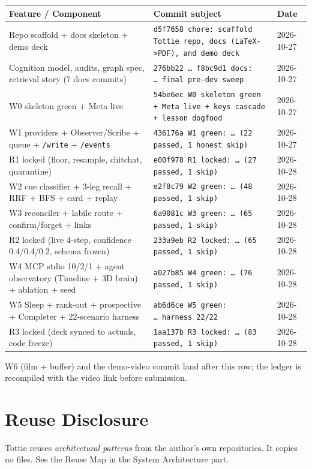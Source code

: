 \begin{longtable}{@{}p{}p{}p{}@{}}
\toprule
Feature / Component & Commit subject & Date \\
\midrule
Repo scaffold + docs skeleton + demo deck &
\texttt{d5f7658 chore: scaffold Tottie repo, docs (LaTeX-\textgreater PDF), and demo deck} & 2026-10-27 \\
Cognition model, audits, graph spec, retrieval story (7 docs commits) &
\texttt{276bb22 \ldots\ f8bc9d1 docs: \ldots\ final pre-dev sweep} & 2026-10-27 \\
W0 skeleton green + Meta live &
\texttt{54be6ec W0 skeleton green + Meta live + keys cascade + lesson dogfood} & 2026-10-27 \\
W1 providers + Observer/Scribe + queue + \texttt{/write} + \texttt{/events} &
\texttt{436176a W1 green: \ldots\ (22 passed, 1 honest skip)} & 2026-10-27 \\
R1 locked (floor, resample, chitchat, quarantine) &
\texttt{e00f978 R1 locked: \ldots\ (27 passed, 1 skip)} & 2026-10-28 \\
W2 cue classifier + 3-leg recall + RRF + BFS + card + replay &
\texttt{e2f8c79 W2 green: \ldots\ (48 passed, 1 skip)} & 2026-10-28 \\
W3 reconciler + labile route + confirm/forget + links &
\texttt{6a9081c W3 green: \ldots\ (65 passed, 1 skip)} & 2026-10-28 \\
R2 locked (live 4-step, confidence 0.4/0.4/0.2, schema frozen) &
\texttt{233a9eb R2 locked: \ldots\ (65 passed, 1 skip)} & 2026-10-28 \\
W4 MCP stdio 10/2/1 + agent observatory (Timeline + 3D brain) + ablation + seed &
\texttt{a027b85 W4 green: \ldots\ (76 passed, 1 skip)} & 2026-10-28 \\
W5 Sleep + rank-out + prospective + Completer + 22-scenario harness &
\texttt{ab6d6ce W5 green: \ldots\ harness 22/22} & 2026-10-28 \\
R3 locked (deck synced to actuals, code freeze) &
\texttt{1aa137b R3 locked: \ldots\ (83 passed, 1 skip)} & 2026-10-28 \\
\bottomrule
\end{longtable}
W6 (film + buffer) and the demo-video commit land after this row; the ledger is
recompiled with the video link before submission.

\section{Reuse Disclosure}
Tottie reuses \emph{architectural patterns} from the author's own repositories. It copies no files.
See the Reuse Map in the System Architecture part.
